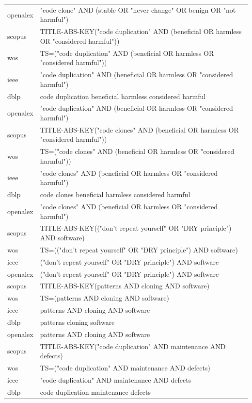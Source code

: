 \documentclass{article}
\begin{document}
\begin{longtable}{lp{10cm}}
openalex & "code clone" AND (stable OR "never change" OR benign OR "not harmful") \\
scopus & TITLE-ABS-KEY("code duplication" AND (beneficial OR harmless OR "considered harmful")) \\
wos & TS=("code duplication" AND (beneficial OR harmless OR "considered harmful")) \\
ieee & "code duplication" AND (beneficial OR harmless OR "considered harmful") \\
dblp & code duplication beneficial harmless considered harmful \\
openalex & "code duplication" AND (beneficial OR harmless OR "considered harmful") \\
scopus & TITLE-ABS-KEY("code clones" AND (beneficial OR harmless OR "considered harmful")) \\
wos & TS=("code clones" AND (beneficial OR harmless OR "considered harmful")) \\
ieee & "code clones" AND (beneficial OR harmless OR "considered harmful") \\
dblp & code clones beneficial harmless considered harmful \\
openalex & "code clones" AND (beneficial OR harmless OR "considered harmful") \\
scopus & TITLE-ABS-KEY(("don't repeat yourself" OR "DRY principle") AND software) \\
wos & TS=(("don't repeat yourself" OR "DRY principle") AND software) \\
ieee & ("don't repeat yourself" OR "DRY principle") AND software \\
openalex & ("don't repeat yourself" OR "DRY principle") AND software \\
scopus & TITLE-ABS-KEY(patterns AND cloning AND software) \\
wos & TS=(patterns AND cloning AND software) \\
ieee & patterns AND cloning AND software \\
dblp & patterns cloning software \\
openalex & patterns AND cloning AND software \\
scopus & TITLE-ABS-KEY("code duplication" AND maintenance AND defects) \\
wos & TS=("code duplication" AND maintenance AND defects) \\
ieee & "code duplication" AND maintenance AND defects \\
dblp & code duplication maintenance defects \\

\end{longtable}
\end{document}
